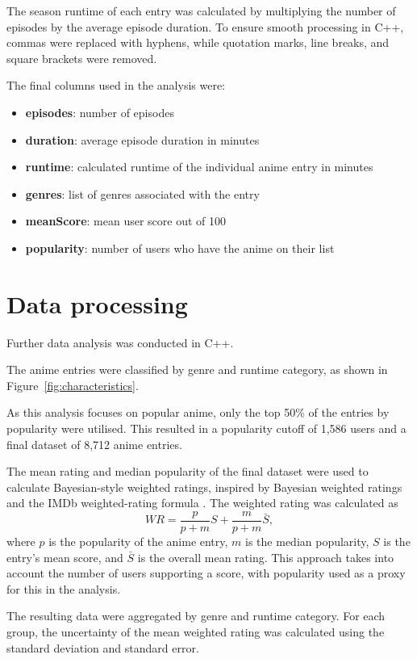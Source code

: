 \documentclass{article}
\begin{document}
The season runtime of each entry was calculated by multiplying the number of episodes by the average episode duration. 
To ensure smooth processing in C++, commas were replaced with hyphens, while quotation marks, line breaks, and square brackets were removed.

The final columns used in the analysis were: 
\begin{itemize}
     \item \textbf{episodes}: number of episodes
     \item \textbf{duration}: average episode duration in minutes
     \item \textbf{runtime}: calculated runtime of the individual anime entry in minutes 
     \item \textbf{genres}: list of genres associated with the entry
     \item \textbf{meanScore}: mean user score out of 100
     \item \textbf{popularity}: number of users who have the anime on their list 
\end{itemize}

\section*{Data processing}
Further data analysis was conducted in C++. 

The anime entries were classified by genre and runtime category, as shown in Figure~\ref{fig:characteristics}. \cite{oscars} \cite{anilist} \cite{paul2026}

As this analysis focuses on popular anime, only the top 50\% of the entries by popularity were utilised. 
This resulted in a popularity cutoff of 1,586 users and a final dataset of 8,712 anime entries. 

The mean rating and median popularity of the final dataset were used to calculate Bayesian-style weighted ratings, inspired by Bayesian weighted ratings \cite{algolia} and the IMDb weighted-rating formula \cite{imdbweighted}. 
The weighted rating was calculated as \[ WR = \frac{p}{p+m}S + \frac{m}{p+m}\bar{S}, \] 
where \(p\) is the popularity of the anime entry, \(m\) is the median popularity, \(S\) is the entry's mean score, and \(\bar{S}\) is the overall mean rating. 
This approach takes into account the number of users supporting a score, with popularity used as a proxy for this in the analysis.

The resulting data were aggregated by genre and runtime category. 
For each group, the uncertainty of the mean weighted rating was calculated using the standard deviation and standard error.
\end{document}
